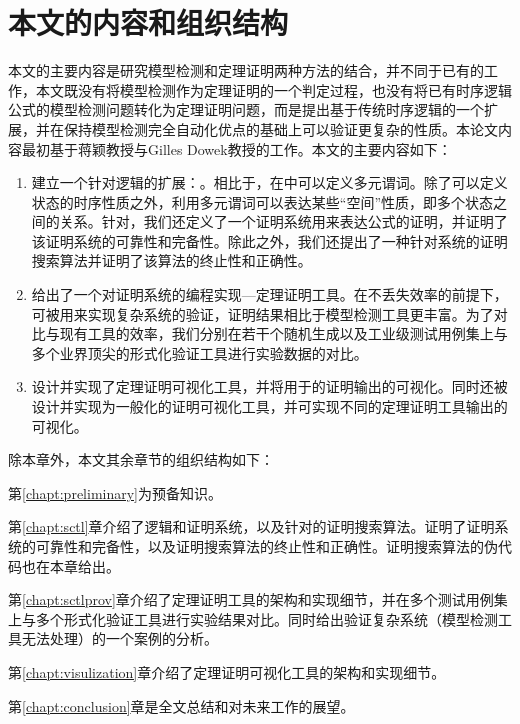 \section{本文的内容和组织结构}
本文的主要内容是研究模型检测和定理证明两种方法的结合，并不同于已有的工作，本文既没有将模型检测作为定理证明的一个判定过程，也没有将已有时序逻辑公式的模型检测问题转化为定理证明问题，而是提出基于传统时序逻辑的一个扩展，并在保持模型检测完全自动化优点的基础上可以验证更复杂的性质。本论文内容最初基于蒋颖教授与Gilles Dowek教授的工作\cite{GY13}。本文的主要内容如下：
\begin{enumerate}
	\item 建立一个针对\CTL{}逻辑的扩展：\CTLP{}。相比于\CTL{}，在\CTLP{}中可以定义多元谓词。除了可以定义状态的时序性质之外，利用多元谓词可以表达某些“空间”性质，即多个状态之间的关系。针对\CTLP{}，我们还定义了一个证明系统\SCTL{}用来表达\CTLP{}公式的证明，并证明了该证明系统的可靠性和完备性。除此之外，我们还提出了一种针对\SCTL{}系统的证明搜索算法并证明了该算法的终止性和正确性。
	\item 给出了一个对证明系统\SCTL{}的编程实现---定理证明工具\sctlprov{}。在不丢失效率的前提下，\sctlprov{}可被用来实现复杂系统的验证，证明结果相比于模型检测工具更丰富。为了对比\sctlprov{}与现有工具的效率，我们分别在若干个随机生成以及工业级测试用例集上与多个业界顶尖的形式化验证工具进行实验数据的对比。
	\item 设计并实现了定理证明可视化工具，并将用于\sctlprov{}的证明输出的可视化。同时还被设计并实现为一般化的证明可视化工具，并可实现不同的定理证明工具输出的可视化。
\end{enumerate}

除本章外，本文其余章节的组织结构如下：

第\ref{chapt:preliminary}为预备知识。

第\ref{chapt:sctl}章介绍了\CTLP{}逻辑和证明系统\SCTL{}，以及针对\SCTL{}的证明搜索算法。证明了\SCTL{}证明系统的可靠性和完备性，以及证明搜索算法的终止性和正确性。证明搜索算法的伪代码也在本章给出。


第\ref{chapt:sctlprov}章介绍了定理证明工具\sctlprov{}的架构和实现细节，并在多个测试用例集上与多个形式化验证工具进行实验结果对比。同时给出\sctlprov{}验证复杂系统（模型检测工具无法处理）的一个案例的分析。

第\ref{chapt:visulization}章介绍了定理证明可视化工具的架构和实现细节。

第\ref{chapt:conclusion}章是全文总结和对未来工作的展望。